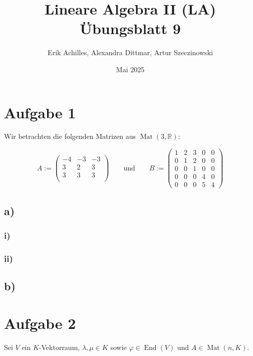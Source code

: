 \documentclass{article}
\title{Lineare Algebra II (LA) Übungsblatt 9}
\author{Erik Achilles, Alexandra Dittmar, Artur Szeczinowski}
\date{Mai 2025}
\newcommand{\RR}{\mathbb{R}}
\DeclareMathOperator{\Mat}{Mat}
\DeclareMathOperator{\End}{End}
\begin{document}

\section*{Aufgabe 1}

Wir betrachten die folgenden Matrizen aus
$\Mat(3, \RR)$:

\[
  A := \left(
  \begin{array}{ccc}
      -4 & -3 & -3 \\
      3  & 2  & 3  \\
      3  & 3  & 3  \\
    \end{array}
  \right)
  \qquad \text{und} \qquad
  B := \left(
  \begin{array}{ccc|ccc}
      1 & 2 & 3 & 0 & 0 \\
      0 & 1 & 2 & 0 & 0 \\
      0 & 0 & 1 & 0 & 0 \\ \hline
      0 & 0 & 0 & 4 & 0 \\
      0 & 0 & 0 & 5 & 4
    \end{array}
  \right)
\]



\subsection*{a)}

\subsubsection*{i)}

\subsubsection*{ii)}

\subsection*{b)}

\newpage

\section*{Aufgabe 2}

Sei $V$ ein $K$-Vektorraum,
$\lambda, \mu \in K$
sowie
$\varphi \in \End(V)$
und
$A \in \Mat(n, K)$.
\end{document}
